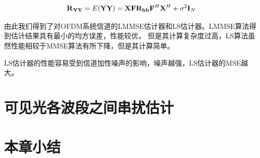 \begin{equation}
\begin{aligned}
\textbf R_{\textbf Y\textbf Y}=E(\textbf Y\textbf Y)=\textbf X\textbf F\textbf R_{\textbf h\textbf h}\textbf F^{H}{\textbf X}^H+\sigma^2{\textbf I}_N\\
\end{aligned}
\end{equation}

由此我们得到了对OFDM系统信道的LMMSE估计器和LS估计器。LMMSE算法得到估计结果具有最小的均方误差，性能较优，
但是其计算复杂度过高，LS算法虽然性能相较于MMSE算法有所下降，但是其计算简单。

LS估计器的性能容易受到信道加性噪声的影响，噪声越强，LS估计器的MSE越大。

\section{可见光各波段之间串扰估计}
\section{本章小结}
